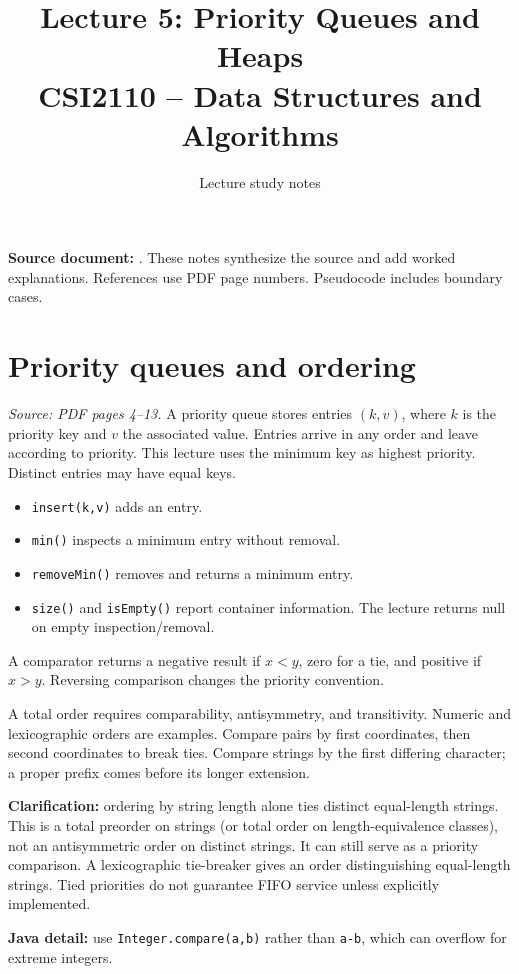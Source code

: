 \documentclass[11pt,letterpaper]{article}
\title{\textbf{Lecture 5: Priority Queues and Heaps}\\\large CSI2110 -- Data Structures and Algorithms}\author{Lecture study notes}\date{}
\newcommand{\sourcepages}[1]{\textit{Source: PDF pages #1.}}
\newcommand{\method}[1]{\texttt{#1}}
\begin{document}
\maketitle
\textbf{Source document:} . These notes synthesize the source and add worked explanations. References use PDF page numbers. Pseudocode includes boundary cases.
\tableofcontents\newpage

\section{Priority queues and ordering}
\sourcepages{4--13}
A priority queue stores entries $(k,v)$, where $k$ is the priority key and $v$ the associated value. Entries arrive in any order and leave according to priority. This lecture uses the minimum key as highest priority. Distinct entries may have equal keys.
\begin{itemize}
\item \method{insert(k,v)} adds an entry.
\item \method{min()} inspects a minimum entry without removal.
\item \method{removeMin()} removes and returns a minimum entry.
\item \method{size()} and \method{isEmpty()} report container information. The lecture returns null on empty inspection/removal.
\end{itemize}
A comparator returns a negative result if $x<y$, zero for a tie, and positive if $x>y$. Reversing comparison changes the priority convention.

A total order requires comparability, antisymmetry, and transitivity. Numeric and lexicographic orders are examples. Compare pairs by first coordinates, then second coordinates to break ties. Compare strings by the first differing character; a proper prefix comes before its longer extension.

\textbf{Clarification:} ordering by string length alone ties distinct equal-length strings. This is a total preorder on strings (or total order on length-equivalence classes), not an antisymmetric order on distinct strings. It can still serve as a priority comparison. A lexicographic tie-breaker gives an order distinguishing equal-length strings. Tied priorities do not guarantee FIFO service unless explicitly implemented.

\textbf{Java detail:} use \method{Integer.compare(a,b)} rather than \method{a-b}, which can overflow for extreme integers.
\end{document}

